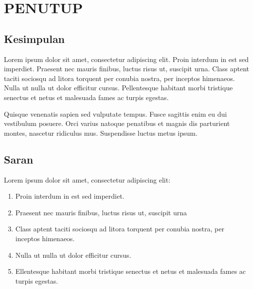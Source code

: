 \chapter{PENUTUP}

\section{Kesimpulan}
Lorem ipsum dolor sit amet, consectetur adipiscing elit. Proin interdum in est sed imperdiet. Praesent nec mauris finibus, luctus risus ut, suscipit urna. Class aptent taciti sociosqu ad litora torquent per conubia nostra, per inceptos himenaeos. Nulla ut nulla ut dolor efficitur cursus. Pellentesque habitant morbi tristique senectus et netus et malesuada fames ac turpis egestas.

Quisque venenatis sapien sed vulputate tempus. Fusce sagittis enim eu dui vestibulum posuere. Orci varius natoque penatibus et magnis dis parturient montes, nascetur ridiculus mus. Suspendisse luctus metus ipsum.

\section{Saran}
Lorem ipsum dolor sit amet, consectetur adipiscing elit:
\begin{enumerate}
    \item Proin interdum in est sed imperdiet.
    \item Praesent nec mauris finibus, luctus risus ut, suscipit urna
    \item Class aptent taciti sociosqu ad litora torquent per conubia nostra, per inceptos himenaeos.
    \item Nulla ut nulla ut dolor efficitur cursus.
    \item Ellentesque habitant morbi tristique senectus et netus et malesuada fames ac turpis egestas.
\end{enumerate}